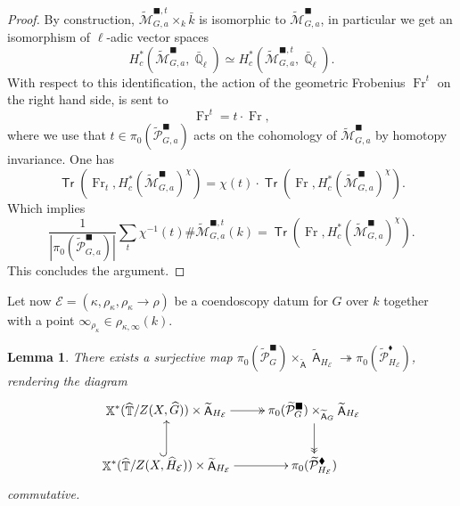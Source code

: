 \documentclass{article}
\DeclareMathOperator{\A}{\mathsf{A}}
\newcommand{\Ec}{\mathcal{E}}
\DeclareMathOperator{\Xb}{\mathbb{X}}
\DeclareMathOperator{\Tb}{\mathbb{T}}
\newcommand{\Mc}{\mathcal{M}}
\DeclareMathOperator{\Tr}{\mathsf{Tr}}
\DeclareMathOperator{\Fr}{Fr}
\DeclareMathOperator{\Qb}{\mathbb{Q}}
\newcommand{\wpc}{\widetilde{\mathcal{P}} }
\newcommand{\wmc}{\widetilde{\Mc} }
\newcommand{\wac}{\widetilde{\A} }
\theoremstyle{definition}
\theoremstyle{plain}
\newtheorem{lemma}[definition]{Lemma}
\begin{document}
\begin{proof}
By construction, $\wmc_{G,a}^{\blacksquare,t} \times_k \bar{k}$ is isomorphic to $\wmc_{G,a}^{\blacksquare}$, in particular we get an isomorphism of $\ell$-adic vector spaces
$$H_c^*(\wmc_{G,a}^{\blacksquare},\bar{\Qb}_{\ell}) \simeq H_c^*(\wmc_{G,a}^{\blacksquare,t},\bar{\Qb}_{\ell}).$$
With respect to this identification, the action of the geometric Frobenius $\Fr^t$ on the right hand side, is sent to
$$\Fr^t=t\cdot{}\Fr,$$
where we use that $t \in \pi_0(\wpc_{G,a}^{\blacksquare})$ acts on the cohomology of $\wmc_{G,a}^{\blacksquare}$ by homotopy invariance. One has
$$\Tr(\Fr_t, H_c^*(\wmc_{G,a}^{\blacksquare})^{\chi}) = \chi(t)\cdot{}\Tr(\Fr, H_c^*(\wmc_{G,a}^{\blacksquare})^{\chi}).$$
Which implies
$$\frac{1}{|\pi_0(\wpc_{G,a}^{\blacksquare})|} \sum_{t} \chi^{-1}(t) \#\wmc_{G,a}^{\blacksquare,t}(k) = \Tr(\Fr, H_c^*(\wmc_{G,a}^{\blacksquare})^{\chi}).$$
This concludes the argument.
\end{proof}

Let now $\Ec = (\kappa,\rho_\kappa,\rho_\kappa \to \rho)$ be a coendoscopy datum for $G$ over $k$ together with a point $\infty_{\rho_\kappa} \in \rho_{\kappa,\infty}(k)$.
\begin{lemma}\label{lemma:coendo_surjection}
There exists a surjective map $\pi_0(\wpc_{G}^\blacksquare) \times_{\widetilde{\A}} \widetilde{\A}_{H_{\Ec}} \twoheadrightarrow  \pi_0(\wpc_{H_{\Ec}}^{\blacklozenge})$, rendering the diagram
\[
\xymatrix{
\Xb^*(\widehat{\Tb}/Z(X,\widehat{G})) \times \wac_{H_{\Ec}} \ar@{->>}[r]  &  \pi_0( \wpc_{{G}}^{\blacksquare}) \times_{\wac_G} \wac_{H_{\Ec}} \ar@{->>}[d]\\
\Xb^*(\widehat{\Tb}/Z(X,\widehat{H}_{\Ec})) \times \wac_{H_{\Ec}} \ar@{->}[r] \ar@{^(->}[u]  & \pi_0( \wpc_{{H}_{\Ec}}^{\blacklozenge})
}
\]
commutative. 
\end{lemma}
\end{document}
